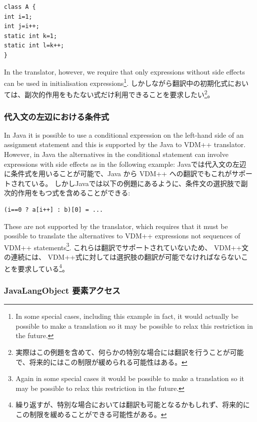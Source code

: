 \documentclass[\pformat,12pt]{jarticle}
\begin{document}
\begin{small}
\begin{verbatim}
class A {
int i=1;
int j=i++;
static int k=1;
static int l=k++;
}
\end{verbatim}
\end{small}

In the translator, however, we require that only expressions without
side effects can be used in initialisation expressions\footnote{In
  some special cases, including this example in fact, it would
  actually be possible to make a translation so it may be possible to
  relax this restriction in the future.}.
しかしながら翻訳中の初期化式においては、副次的作用をもたない式だけ利用できることを要求したい\footnote{実際はこの例題を含めて、何らかの特別な場合には翻訳を行うことが可能で、将来的にはこの制限が緩められる可能性はある。}。

\subsubsection{代入文の左辺における条件式}

In Java it is possible to use a conditional expression on the
left-hand side of an assignment statement and this is supported by the
Java to VDM++ translator. However, in Java the alternatives in the
conditional statement can involve expressions with side effects as in
the following example:
Javaでは代入文の左辺に条件式を用いることが可能で、Java から VDM++ への翻訳でもこれがサポートされている。
しかしJavaでは以下の例題にあるように、条件文の選択肢で副次的作用をもつ式を含めることができる:

\begin{small}
\begin{verbatim}
(i==0 ? a[i++] : b)[0] = ...
\end{verbatim}
\end{small}

These are not supported by the translator, which requires that it must
be possible to translate the alternatives to VDM++ expressions not
sequences of VDM++ statements\footnote{Again in some special cases it
  would be possible to make a translation so it may be possible to
  relax this restriction in the future.}.
これらは翻訳でサポートされていないため、 VDM++文の連続には、 VDM++式に対しては選択肢の翻訳が可能でなければならないことを要求している\footnote{繰り返すが、特別な場合においては翻訳も可能となるかもしれず、将来的にこの制限を緩めることができる可能性がある。}。

\subsubsection{JavaLangObject 要素アクセス}
\end{document}
